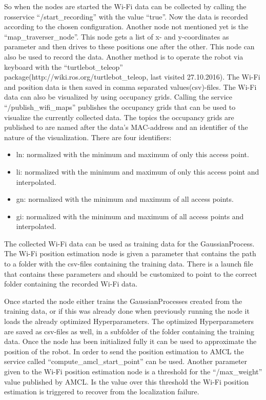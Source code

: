 So when the nodes are started the Wi-Fi data can be collected by calling the rosservice ``/start\_recording'' with the value ``true''. Now the data is recorded according to the chosen configuration. Another node not mentioned yet is the ``map\_traverser\_node''. This node gets a list of x- and y-coordinates as parameter and then drives to these positions one after the other. This node can also be used to record the data. Another method is to operate the robot via keyboard with the ``turtlebot\_teleop'' package(http://wiki.ros.org/turtlebot\_teleop, last visited 27.10.2016). The Wi-Fi and position data is then saved in comma separated values(csv)-files. The Wi-Fi data can also be visualized by using occupancy grids. Calling the service ``/publish\_wifi\_maps'' publishes the occupancy grids that can be used to visualize the currently collected data. The topics the occupancy grids are published to are named after the data's \Gls{MAC-address} and an identifier of the nature of the visualization. There are four identifiers:
\begin{itemize}
\item ln: normalized with the minimum and maximum of only this access point.
\item li: normalized with the minimum and maximum of only this access point and interpolated.
\item gn: normalized with the minimum and maximum of all access points.
\item gi: normalized with the minimum and maximum of all access points and interpolated.
\end{itemize}

The collected Wi-Fi data can be used as training data for the \Gls{GaussianProcess}. The Wi-Fi position estimation node is given a parameter that contains the path to a folder with the csv-files containing the training data. There is a launch file that contains these parameters and should be customized to point to the correct folder containing the recorded Wi-Fi data.

Once started the node either trains the \Gls{GaussianProcess}es created from the training data, or if this was already done when previously running the node it loads the already optimized \gls{Hyperparameter}s. The optimized \gls{Hyperparameter}s are saved as csv-files as well, in a subfolder of the folder containing the training data. Once the node has been initialized fully it can be used to approximate the position of the robot. In order to send the position estimation to AMCL the service called ``compute\_amcl\_start\_point'' can be used. Another parameter given to the Wi-Fi position estimation node is a threshold for the ``/max\_weight'' value published by AMCL. Is the value over this threshold the Wi-Fi position estimation is triggered to recover from the localization failure. 

